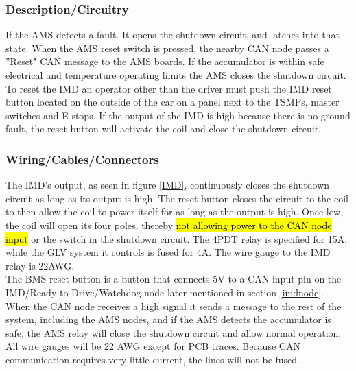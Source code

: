 \documentclass{article}
\DeclareRobustCommand{\hlr}[1]{{\sethlcolor{red}\hl{#1}}}
\begin{document}
        \subsubsection{Description/Circuitry}


            If the AMS detects a fault. It opens the shutdown circuit, and latches into that state. When the AMS reset switch is pressed, the nearby CAN node passes a ''Reset" CAN message to the AMS boards. If the accumulator is within safe electrical and temperature operating limits the AMS closes the shutdown circuit.\\
        
           To reset the IMD an operator other than the driver must push the IMD reset button located on the outside of the car on a panel next to the TSMPs, master switches and E-stops. If the output of the IMD is high because there is no ground fault, the reset button will activate the coil and close the shutdown circuit. 

        \subsubsection{Wiring/Cables/Connectors}
        
            The IMD's output, as seen in figure \ref{IMD}, continuously closes the shutdown circuit as long as its output is high. The reset button closes the circuit to the coil to then allow the coil to power itself for as long as the output is high. Once low, the coil will open its four poles, thereby \hlr{not allowing power to the CAN node input} or the switch in the shutdown circuit. The 4PDT relay is specified for 15A, while the GLV system it controls is fused for 4A. The wire gauge to the IMD relay is 22AWG.\\
            
            The BMS reset button is a button that connects 5V to a CAN input pin on the IMD/Ready to Drive/Watchdog node later mentioned in section \ref{imdnode}. When the CAN node receives a high signal it sends a message to the rest of the system, including the AMS nodes, and if the AMS detects the accumulator is safe, the AMS relay will close the shutdown circuit and allow normal operation. All wire gauges will be 22 AWG except for PCB traces. Because CAN communication requires very little current, the lines will not be fused.\\
            
\end{document}
